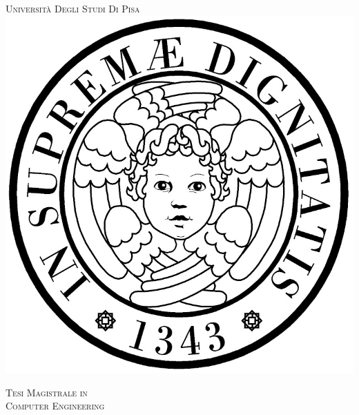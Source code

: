 \makeatletter
{}

\begin{titlepage}
    \newcommand{\HRule}{\rule{\linewidth}{0.5mm}}
    
    \center 
    \textsc{\LARGE Università Degli Studi Di Pisa }\\[0.3cm]

    \vspace{1cm}
    \includegraphics[scale=0.7]{img/logo.png}
    \vspace{1cm}
  
    \textsc{\Large Tesi Magistrale in }\\[0.5cm]
    \textsc{\Large Computer Engineering }\\[1.5cm]


    { \huge \bfseries \@title }\\[1.5cm] 
    

\end{titlepage}
